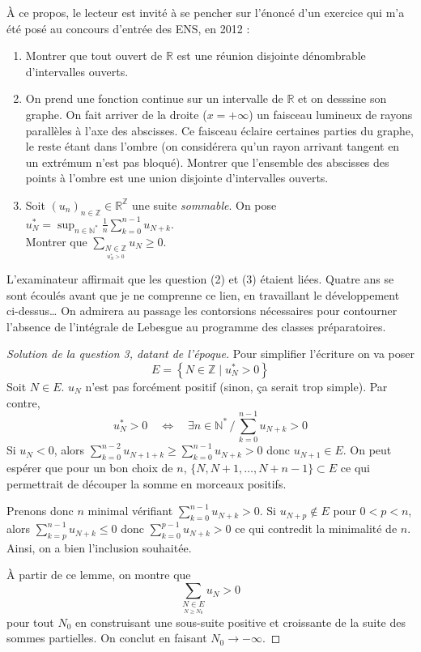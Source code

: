 \documentclass[a4paper, 11pt]{article}
\begin{document}
À ce propos, le lecteur est invité à se pencher sur l'énoncé d'un exercice qui
m'a été posé au concours d'entrée des ENS, en 2012 :
\begin{enumerate}
\item Montrer que tout ouvert de $\mathbb{R}$ est une réunion disjointe dénombrable d'intervalles ouverts.
\item On prend une fonction continue sur un intervalle de $\mathbb{R}$ et on desssine son graphe. On fait arriver de la droite ($x = +\infty$) un faisceau lumineux de rayons parallèles à l'axe des abscisses. Ce faisceau éclaire certaines parties du graphe, le reste étant dans l'ombre (on considérera qu'un rayon arrivant tangent en un extrémum n'est pas bloqué). Montrer que l'ensemble des abscisses des points à l'ombre est une union disjointe d'intervalles ouverts.
\item Soit $(u_n)_{n \in \mathbb{Z}} \in \mathbb{R}^{\mathbb{Z}}$ une suite \emph{sommable}. On pose $u^*_N = \displaystyle \sup_{n \in \mathbb{N}^*} \frac{1}{n} \sum_{k=0}^{n-1} u_{N+k}$.\\ Montrer que $\displaystyle \sum_{\underset{u_N^* > 0}{N \in \mathbb{Z}}} u_N \geq 0$.
\end{enumerate}
L'examinateur affirmait que les question (2) et (3) étaient liées. Quatre ans se
sont écoulés avant que je ne comprenne ce lien, en travaillant le développement
ci-dessus… On admirera au passage les contorsions nécessaires pour contourner
l'absence de l'intégrale de Lebesgue au programme des classes préparatoires.
\begin{proof}[Solution de la question 3, datant de l'époque]
  Pour simplifier l'écriture on va poser
  \[E = \left\{ N \in \mathbb{Z} \mid u^*_N > 0 \right\}\]
  Soit $N \in E$. $u_N$ n'est pas forcément positif (sinon, ça serait trop
  simple). Par contre,
  \[ u^*_N > 0 \quad \Leftrightarrow \quad
    \exists n \in \mathbb{N}^* \,/\, \sum_{k=0}^{n-1} u_{N+k} > 0 \]
  Si $u_N < 0$, alors $ \sum_{k=0}^{n-2} u_{N+1+k} \geq
  \sum_{k=0}^{n-1} u_{N+k} > 0$ donc $u_{N+1} \in E$.
  On peut espérer que pour un bon choix de $n$, $\{N,N+1,\ldots,N+n-1\} \subset E$
  ce qui permettrait de découper la somme en morceaux positifs.

Prenons donc $n$ minimal vérifiant $ \sum_{k=0}^{n-1} u_{N+k} > 0$. Si $u_{N+p}
\not\in E$ pour $0 < p < n$, alors $ \sum_{k=p}^{n-1} u_{N+k} \leq 0$ donc $
\sum_{k=0}^{p-1} u_{N+k} > 0$ ce qui contredit la minimalité de $n$. Ainsi, on a
bien l'inclusion souhaitée.

À partir de ce lemme, on montre que
 \[ \sum_{\underset{N \geq N_0}{N \in E}} u_N > 0 \]
 pour tout $N_0$ en construisant une sous-suite positive et croissante de la
suite des sommes partielles. On conclut en faisant $N_0 \to -\infty$.

\end{proof}
\end{document}
